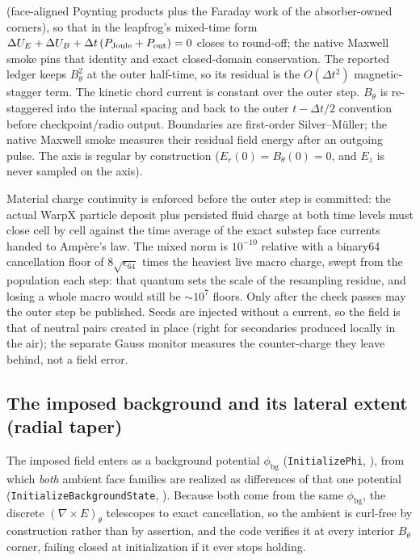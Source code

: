 \documentclass[11pt]{article}
\DeclareRobustCommand{\code}[1]{\ifmmode\text{\ttfamily#1}\else\nolinkurl{#1}\fi}
\begin{document}
(face-aligned Poynting products plus the Faraday work of the absorber-owned
corners), so that in the leapfrog's mixed-time form
$\Delta U_E+\Delta U_B+\Delta t\,(P_{\rm Joule}+P_{\rm out})=0$ closes to
round-off; the native Maxwell smoke pins that identity and exact closed-domain
conservation. The reported ledger keeps $B_\theta^2$ at the outer half-time,
so its residual is the $O(\Delta t^2)$ magnetic-stagger term. The kinetic
chord current is constant over the outer step.
$B_\theta$ is re-staggered into the internal
spacing and back to the outer $t-\Delta t/2$ convention before checkpoint/radio
output.
Boundaries are first-order Silver--M\"uller; the native Maxwell smoke measures
their residual field energy after an outgoing pulse. The
axis is regular by construction ($E_r(0)=B_\theta(0)=0$, and $E_z$ is never
sampled on the axis).

Material charge continuity is enforced before the outer step is committed: the
actual WarpX particle deposit plus persisted fluid charge at both time levels
must close cell by cell against the time average of the exact substep face
currents handed to Amp\`ere's law.
The mixed norm is $10^{-10}$ relative with a binary64 cancellation floor of
$8\sqrt{\epsilon_{64}}$ times the heaviest live macro charge, swept from the
population each step: that quantum sets the scale of the resampling residue,
and losing a whole macro would still be ${\sim}10^7$ floors. Only after the
check passes may the outer step be published. Seeds are injected without a
current, so the field is that of neutral pairs created in place (right for
secondaries produced locally in the air); the separate Gauss monitor measures
the counter-charge they leave behind, not a field error.

\subsection{The imposed background and its lateral extent (radial taper)}
\label{sec:field-taper}

The imposed field enters as a background potential $\phi_{\mathrm{bg}}$
(\code{InitializePhi}, ), from which \emph{both}
ambient face families are realized as differences of that one potential
(\code{InitializeBackgroundState}, ).  Because both come from
the same $\phi_{\mathrm{bg}}$, the discrete $(\nabla\times E)_\theta$
telescopes to exact cancellation, so the ambient is curl-free by construction
rather than by assertion, and the code verifies it at every interior
$B_\theta$ corner, failing closed at initialization if it ever stops holding.
\end{document}
